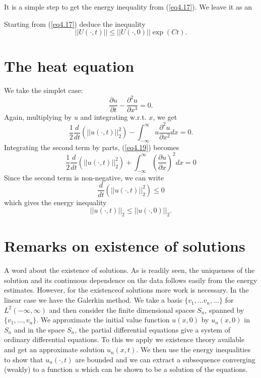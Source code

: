 It is a simple step to get the energy inequality from (\ref{eq4.17}). We leave
it as an 

\begin{exercise}\label{chap4:exer4.2}
Starting from (\ref{eq4.17}) deduce the inequality
$$
||U (\cdot, t) || \leq || U(\cdot , 0)|| \exp (Ct). 
$$
\end{exercise}

\section{The heat equation}\label{chap4:sec4.4}
We take the simplet case:
\begin{equation*}
\frac{\partial u}{\partial t} - \frac{\partial^2 u}{\partial x^3} =
0. \tag{4.18}\label{eq4.18}
\end{equation*}
Again, multiplying by $u$ and integrating w.r.t. $x$, we get
\begin{equation*}
\frac{1}{2} \frac{d}{dt} (|| u (\cdot, t) ||^2_2) -
\int^\infty_{-\infty} u \frac{\partial^2u}{\partial x^2} dx =
0. \tag{4.19}\label{eq4.19} 
\end{equation*}
Integrating the second term by parts, (\ref{eq4.19}) becomes 
\begin{equation*}
\frac{1}{2} \frac{d}{dt} (||u(\cdot , t)||^2_2) +
\int^\infty_{-\infty} (\frac{\partial u}{\partial x})^2 dx =0
\tag{4.20} \label{eq4.20}
\end{equation*}
Since the second term is non-negative, we can write 
\begin{equation*}
\frac{d}{dt} (|| u(\cdot ,t) ||^2_2) \leq 0\tag{4.21}\label{eq4.21}
\end{equation*}
which gives the energy inequality
\begin{equation*}
||u(\cdot, t) ||_2 \leq ||u(\cdot, 0)||_2. \tag{4.22}\label{eq4.22}
\end{equation*}

\section{Remarks on existence of solutions}\label{chap4:sec4.5}

A word about the existence of solutions. As is readily seen, the
uniqueness of the solution and its continuous dependence on the data
follows easily from the energy estimates. However, for the
existence\pageoriginale of solutions more work is necessary. In the
linear case we have the Galerkin method. We take a basis $\{v_1,
\ldots v_n, \ldots\}$ for $L^2 (-\infty, \infty)$ and then consider
the finite dimensional spaces $S_n$, spanned by $\{v_1, \ldots,
v_n\}$. We approximate the initial value function $u(x,0)$ by
$u_n(x,0)$ in $S_n$ and in the space $S_n$, the partial
differential equations give a system of ordinary differential
equations. To this we apply we existence theory available and get an
approximate solution $u_n(x,t)$. We then use the energy inequalities
to show that $u_n(\cdot, t)$ are bounded and we can extract a
subsequence converging (weakly) to a function $u$ which can be shown
to be a solution of the equations.

